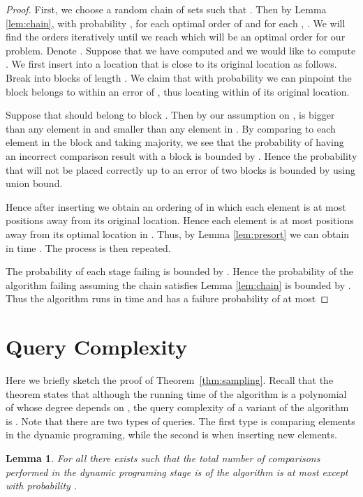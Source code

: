 \documentclass[11pt]{article}
\newtheorem{lemma}[theorem]{Lemma}
\begin{document}
\begin{proof} 
First, we choose a random chain of sets  such 
that . Then by Lemma \ref{lem:chain}, with probability ,
 for each optimal order  of  and for each , .
 We will find the orders  iteratively until we reach  which will be 
 an optimal order for our problem. Denote . Suppose that we have 
 computed  and we would like to compute . We first  insert
  into a location that is close to its original location as follows.
Break  into blocks  of length . We claim 
that with probability  we can pinpoint the block  belongs to 
within an error of , thus locating  within  of its original 
location. 

Suppose that  should belong to block . Then by our assumption on 
,  is bigger than any element in  and smaller
than any element in . By comparing  to each element in 
the block and taking majority, we see that the probability of having an incorrect
comparison result with a block  is bounded by . Hence 
the probability that  will not be placed correctly up to an error of two 
blocks is bounded by  using union bound.
 
 


  Hence after inserting  we obtain an ordering of  in which each element is at most 
   positions away from its original location. Hence each element is at most  
  positions away from its optimal location in . Thus, by Lemma \ref{lem:presort} we can obtain 
   in time . The process is then repeated. 
  
  The probability of each stage failing is bounded by . Hence the probability of the 
  algorithm failing assuming the chain   satisfies Lemma \ref{lem:chain}
  is bounded by . 
  Thus the algorithm runs in time  and has a failure probability of 
  at most 
 
\end{proof}

\section{Query Complexity} \label{sec:query}
Here we briefly sketch the proof of Theorem~\ref{thm:sampling}. Recall that the 
theorem states that  
although the running time of the algorithm is a polynomial of  whose degree 
depends on , the query complexity of a variant of the algorithm is 
. Note that there are two types of queries. The first type 
is comparing elements in the dynamic programing, while the second is when inserting new elements. 

\begin{lemma} \label{lem:dynamic_query}
For all  there exists  
such that the total number of comparisons performed in the dynamic 
programing stage is  of the algorithm is at most 
 except with probability .
\end{lemma}
\end{document}
